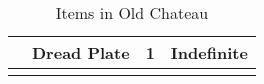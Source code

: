 \begin{longtable}{|| l l l l ||}%
\hline%
&Dread Plate&1&Indefinite\\%
\hline%
\endhead%
\hline%
\caption{Items in Old Chateau}%
\label{tab:OldChateauItems}%
\end{longtable}